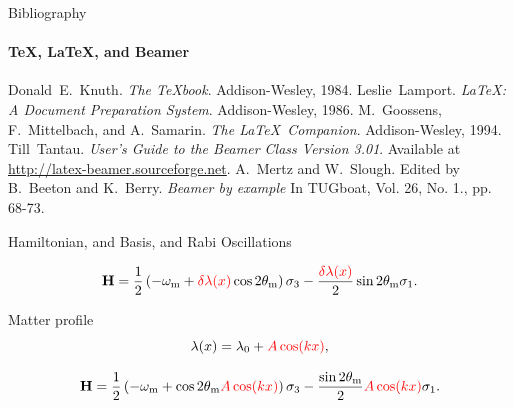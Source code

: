 \documentclass[9pt]{beamer}
\begin{document}
\begin{darkframes}
    \begin{frame}[label=bibliography]{Bibliography}
      \framesubtitle{\TeX, \LaTeX, and Beamer}
      \begin{thebibliography}{9}
            Donald~E.~Knuth.
            \emph{The \TeX book}.
            Addison-Wesley, 1984.
            Leslie~Lamport.
            \emph{\LaTeX : A Document Preparation System}.
            Addison-Wesley, 1986.
            M.~Goossens, F.~Mittelbach, and A.~Samarin.
            \emph{The \LaTeX\ Companion}.
            Addison-Wesley, 1994.
            Till~Tantau.
            \emph{User's Guide to the Beamer Class Version 3.01}.
            Available at \url{http://latex-beamer.sourceforge.net}.
            A.~Mertz and W.~Slough.
            Edited by B.~Beeton and K.~Berry.
            \emph{Beamer by example} In TUGboat,
              Vol. 26, No. 1., pp. 68-73.
      \end{thebibliography}
    \end{frame}

  \end{darkframes}



\appendix

\begin{frame}{Hamiltonian, and Basis, and Rabi Oscillations}



\begin{tcolorbox}[title=Hamiltonian in Background Matter Basis]
    \begin{equation*}
    \mathbf {H} = \frac{1}{2}\left( - \omega_{\mathrm{m}} + {\color{red}\delta \lambda(x)} \cos 2\theta_{\mathrm{m}} \right) \sigma_3 - \frac{  {\color{red}\delta \lambda(x)}  }{2} \sin 2\theta_{\mathrm{m}} \sigma_1.
\end{equation*}
\end{tcolorbox}


Matter profile
\begin{equation*}
    \lambda(x) = \lambda_0 + {\color{red}A \cos (k x)},
\end{equation*}


\begin{equation*}
    \mathbf {H} = \frac{1}{2}\left( - \omega_{\mathrm{m}} +  \cos 2\theta_{\mathrm{m}}{\color{red}A\cos(kx)} \right) \sigma_3 - \frac{  \sin 2\theta_{\mathrm{m} }  }{2}{\color{red}A \cos(kx)}  \sigma_1.
\end{equation*}





\end{frame}
\end{document}
